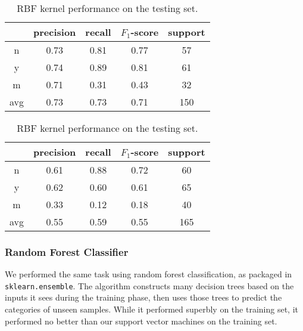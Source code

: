 \documentclass[11pt]{article}
\begin{document}
\begin{table}
  \centering
  \begin{tabular}[!htbp]{c|c c c c}
        & precision &recall &$F_1$-score &support \\ \hline
    n   & 0.73      &0.81   &0.77     &57      \\
    y   & 0.74      &0.89   &0.81     &61      \\
    m   & 0.71      &0.31   &0.43     &32      \\ \hline
    avg & 0.73      &0.73   &0.71     &150     \\
  \end{tabular}
  \caption{Reconstructing the training set with RBF kernel.}
  \label{tab:rbftrain}

  \begin{tabular}[!htbp]{c|c c c c}
        & precision &recall &$F_1$-score &support \\ \hline
    n   & 0.61      &0.88   &0.72     &60      \\
    y   & 0.62      &0.60   &0.61     &65      \\
    m   & 0.33      &0.12   &0.18     &40      \\ \hline
    avg & 0.55      &0.59   &0.55     &165     \\
  \end{tabular}
  \caption{RBF kernel performance on the testing set.}
  \label{tab:rbftest}
\end{table}


\subsubsection{Random Forest Classifier}
\label{sec:randfor}
We performed the same task using random forest classification, as
packaged in \verb|sklearn.ensemble|.  The algorithm constructs many
decision trees based on the inputs it sees during the training phase,
then uses those trees to predict the categories of unseen
samples. While it performed superbly on the training set, it performed
no better than our support vector machines on the training set.
\end{document}
